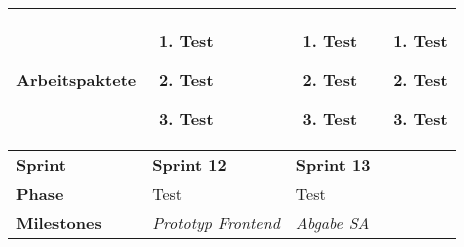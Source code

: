 \begin{landscape}
\begin{longtable}{l p{5.5cm} p{5.5cm} p{5.5cm}}
        \textbf{Arbeitspaktete}
                                & \begin{enumerate}[noitemsep]
                                    \item Test
                                    \item Test
                                    \item Test
                                \end{enumerate}
                                & \begin{enumerate}[noitemsep]
                                    \item Test
                                    \item Test
                                    \item Test
                                \end{enumerate}
                                & \begin{enumerate}[noitemsep]
                                    \item Test
                                    \item Test
                                    \item Test
                                \end{enumerate} \\
                                
        
        \toprule
        \textbf{Sprint}
                                & \textbf{Sprint 12}
                                & \textbf{Sprint 13}
                                & \\
        
        \midrule
        \textbf{Phase}
                                & Test
                                & Test
                                & \\
        
        \textbf{Milestones}
                                & \textit{Prototyp Frontend}
                                & \textit{Abgabe SA}
                                & \\
        

\end{longtable}
\end{landscape}
